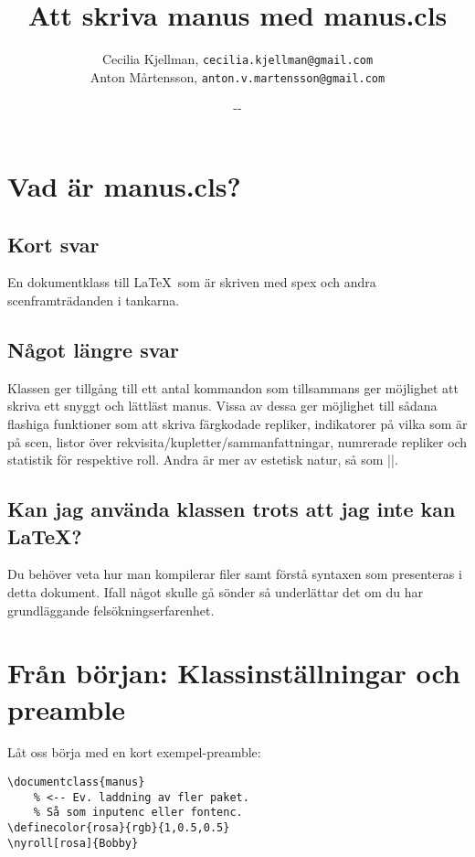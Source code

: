 \documentclass[a4paper,12pt]{article}
\newcommand*{\pack}{\textsf}
\renewcommand{\dateseparator}{-}
\newcommand{\todayiso}{%
	\the\year\dateseparator\twodigit\month\dateseparator\twodigit\day}
\begin{document}
\title{Att skriva manus med \pack{manus.cls}}
\author{%
	Cecilia Kjellman, \texttt{cecilia.kjellman@gmail.com}\\%
	Anton Mårtensson, \texttt{anton.v.martensson@gmail.com}}
\date{\todayiso}
\maketitle



\newpage
\tableofcontents
\newpage



\section{Vad är \pack{manus.cls}?}

\subsection{Kort svar}
En dokumentklass till \LaTeX\ som är skriven med spex och andra scenframträdanden i tankarna.

\subsection{Något längre svar}
Klassen ger tillgång till ett antal kommandon som tillsammans ger möjlighet att skriva ett snyggt och lättläst manus. Vissa av dessa ger möjlighet till sådana flashiga funktioner som att skriva färgkodade repliker, indikatorer på vilka som är på scen, listor över rekvisita/kupletter/sammanfattningar, numrerade repliker och statistik för respektive roll. Andra är mer av estetisk natur, så som |\akt|. 

\subsection{Kan jag använda klassen trots att jag inte kan \LaTeX?}
Du behöver veta hur man kompilerar filer samt förstå syntaxen som presenteras i detta dokument. Ifall något skulle gå sönder så underlättar det om du har grundläggande felsökningserfarenhet.



\section{Från början: Klassinställningar och preamble}
Låt oss börja med en kort exempel-preamble:

\begin{lstlisting}
\documentclass{manus}
	% <-- Ev. laddning av fler paket.
	% Så som inputenc eller fontenc.
\definecolor{rosa}{rgb}{1,0.5,0.5}
\nyroll[rosa]{Bobby}
\end{lstlisting}
\end{document}
